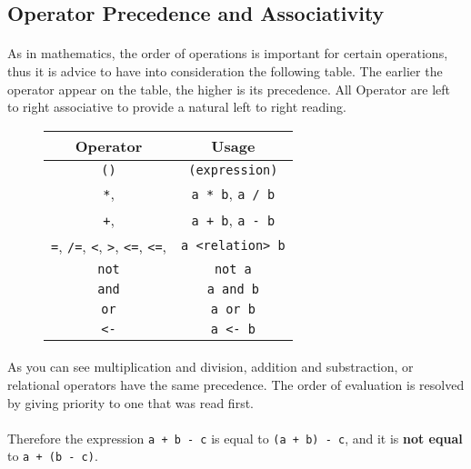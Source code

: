 \subsection{Operator Precedence and Associativity}

\paragraph{} As in mathematics, the order of operations is important for certain
operations, thus it is advice to have into consideration the following table.
The earlier the operator appear on the table, the higher is its precedence. All
Operator are left to right associative to provide a natural left to right
reading.

\begin{figure}[h]
    \centering
    \begin{tabular}{cc}
        \toprule
        \textbf{Operator} & \textbf{Usage} \\
        \midrule \texttt{()} & \texttt{(expression)}\\
        \midrule \texttt{*}, \text{/} & \texttt{a * b}, \texttt{a / b}\\
        \midrule \texttt{+}, \text{-} & \texttt{a + b}, \texttt{a {-} b}\\
        \midrule
        \texttt{=}, \texttt{/=}, \texttt{<},
        \texttt{>}, \texttt{<=}, \texttt{<=}, &
        \texttt{a <relation> b}\\
        \midrule \texttt{not} & \texttt{not a}\\
        \midrule \texttt{and} & \texttt{a and b}\\
        \midrule \texttt{or} & \texttt{a or b}\\
        \midrule \texttt{<-} & \texttt{a <- b}\\
        \bottomrule
    \end{tabular}
\end{figure}

\paragraph{} As you can see multiplication and division, addition and
substraction, or relational operators have the same precedence. The order of
evaluation is resolved by giving priority to one that was read first.

\paragraph{} Therefore the expression \texttt{a {+} b {-} c} is equal to
\texttt{(a {+} b) {-} c}, and it is \textbf{not equal} to
\texttt{a {+} (b {-} c)}.

